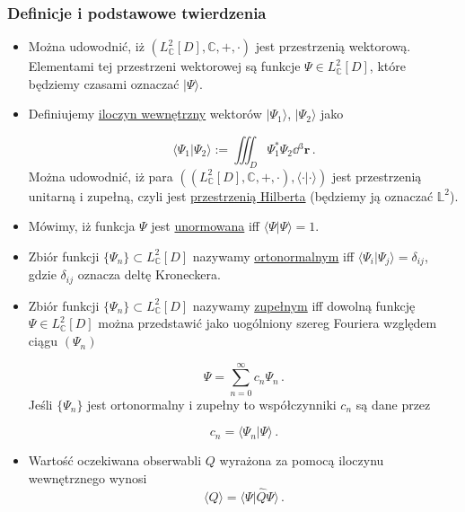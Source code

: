 \documentclass{myclass}
\begin{document}
\subsubsection{Definicje i podstawowe twierdzenia}

\begin{itemize}

\item Można udowodnić, iż \((L^2_\mathbb{C}[D],\mathbb{C},+,\cdot)\) jest przestrzenią wektorową.
Elementami tej przestrzeni wektorowej są funkcje \(\Psi\in L^2_\mathbb{C}[D]\), które będziemy
czasami oznaczać \(|\Psi\rangle\).

\item Definiujemy \underline{iloczyn wewnętrzny} wektorów \(|\Psi_1\rangle\), \(|\Psi_2\rangle\)
jako

\begin{equation*}
    \langle\Psi_1|\Psi_2\rangle := \iiint_{D}\Psi_1^*\Psi_2\dd{^3\mathbf{r}}\,.
\end{equation*}
Można udowodnić, iż para
\(\left((L^2_\mathbb{C}[D],\mathbb{C},+,\cdot),\langle\cdot|\cdot\rangle\right)\) jest przestrzenią
unitarną i zupełną, czyli jest \underline{przestrzenią Hilberta} (będziemy ją oznaczać
\(\mathbb{L}^2\)).

\item Mówimy, iż funkcja \(\Psi\) jest \underline{unormowana} iff \(\langle\Psi|\Psi\rangle=1\).

\item Zbiór funkcji \(\{\Psi_n\}\subset L^2_\mathbb{C}[D]\) nazywamy \underline{ortonormalnym} iff
\(\langle\Psi_i|\Psi_j\rangle=\delta_{ij}\), gdzie \(\delta_{ij}\) oznacza deltę Kroneckera.

\item Zbiór funkcji \(\{\Psi_n\}\subset L^2_\mathbb{C}[D]\) nazywamy \underline{zupełnym} iff
dowolną funkcję \(\Psi\in L^2_\mathbb{C}[D]\) można przedstawić jako uogólniony szereg Fouriera
względem ciągu \((\Psi_n)\)

\begin{equation*}
    \Psi=\sum_{n=0}^\infty c_n\Psi_n\,.
\end{equation*}
Jeśli \(\{\Psi_n\}\) jest ortonormalny i zupełny to współczynniki \(c_n\) są dane przez

\begin{equation*}
    c_n=\langle \Psi_n|\Psi\rangle\,.
\end{equation*}

\item Wartość oczekiwana obserwabli \(Q\) wyrażona za pomocą iloczynu wewnętrznego wynosi 
\begin{equation*}
    \boxed{\langle Q\rangle = \langle\Psi|\hat{Q}\Psi\rangle}\,.
\end{equation*}


\end{itemize}
\end{document}
